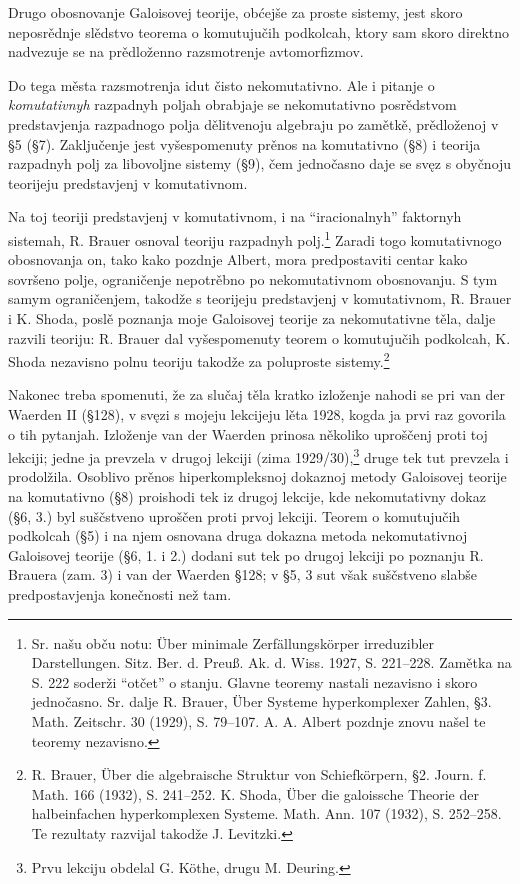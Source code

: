 \documentclass[11pt]{article}
\newcommand{\foreign}[1]{#1}
\begin{document}
Drugo obosnovanje Galoisovej teorije, obćejše za proste sistemy, jest skoro neposrědnje slědstvo teorema o komutujučih podkolcah, ktory sam skoro direktno nadvezuje se na prědloženno razsmotrenje avtomorfizmov.

Do tega města razsmotrenja idut čisto nekomutativno. Ale i pitanje o \emph{komutativnyh} razpadnyh poljah obrabjaje se nekomutativno posrědstvom predstavjenja razpadnogo polja dělitvenoju algebraju po zamětkě, prědloženoj v §5 (§7). Zaključenje jest vyšespomenuty prěnos na komutativno (§8) i teorija razpadnyh polj za libovoljne sistemy (§9), čem jednočasno daje se svęz s obyčnoju teorijeju predstavjenj v komutativnom.

Na toj teoriji predstavjenj v komutativnom, i na ``iracionalnyh'' faktornyh sistemah, R. Brauer osnoval teoriju razpadnyh polj.\footnote{Sr. našu obču notu: \foreign{Über minimale Zerfällungskörper irreduzibler Darstellungen}. Sitz. Ber. d. Preuß. Ak. d. Wiss. 1927, S. 221--228. Zamětka na S. 222 soderži ``otčet'' o stanju. Glavne teoremy nastali nezavisno i skoro jednočasno. Sr. dalje R. Brauer, \foreign{Über Systeme hyperkomplexer Zahlen}, §3. Math. Zeitschr. 30 (1929), S. 79--107. A. A. Albert pozdnje znovu našel te teoremy nezavisno.} Zaradi togo komutativnogo obosnovanja on, tako kako pozdnje Albert, mora predpostaviti centar kako sovršeno polje, ograničenje nepotrěbno po nekomutativnom obosnovanju. S tym samym ograničenjem, takodže s teorijeju predstavjenj v komutativnom, R. Brauer i K. Shoda, poslě poznanja moje Galoisovej teorije za nekomutativne těla, dalje razvili teoriju: R. Brauer dal vyšespomenuty teorem o komutujučih podkolcah, K. Shoda nezavisno polnu teoriju takodže za poluproste sistemy.\footnote{R. Brauer, \foreign{Über die algebraische Struktur von Schiefkörpern}, §2. Journ. f. Math. 166 (1932), S. 241--252. K. Shoda, \foreign{Über die galoissche Theorie der halbeinfachen hyperkomplexen Systeme}. Math. Ann. 107 (1932), S. 252--258. Te rezultaty razvijal takodže J. Levitzki.}

Nakonec treba spomenuti, že za slučaj těla kratko izloženje nahodi se pri van der Waerden II (§128), v svęzi s mojeju lekcijeju lěta 1928, kogda ja prvi raz govorila o tih pytanjah. Izloženje van der Waerden prinosa několiko uproščenj proti toj lekciji; jedne ja prevzela v drugoj lekciji (zima 1929/30),\footnote{Prvu lekciju obdelal G. Köthe, drugu M. Deuring.} druge tek tut prevzela i prodolžila. Osoblivo prěnos hiperkompleksnoj dokaznoj metody Galoisovej teorije na komutativno (§8) proishodi tek iz drugoj lekcije, kde nekomutativny dokaz (§6, 3.) byl suščstveno uproščen proti prvoj lekciji. Teorem o komutujučih podkolcah (§5) i na njem osnovana druga dokazna metoda nekomutativnoj Galoisovej teorije (§6, 1. i 2.) dodani sut tek po drugoj lekciji po poznanju R. Brauera (zam. 3) i van der Waerden §128; v §5, 3 sut však suščstveno slabše predpostavjenja konečnosti než tam.
\end{document}

